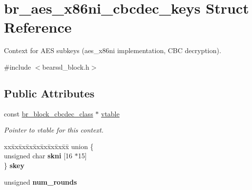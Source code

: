 \hypertarget{structbr__aes__x86ni__cbcdec__keys}{}\section{br\+\_\+aes\+\_\+x86ni\+\_\+cbcdec\+\_\+keys Struct Reference}
\label{structbr__aes__x86ni__cbcdec__keys}


Context for A\+ES subkeys ({\ttfamily aes\+\_\+x86ni} implementation, C\+BC decryption).  




{\ttfamily \#include $<$bearssl\+\_\+block.\+h$>$}

\subsection*{Public Attributes}
\begin{DoxyCompactItemize}
\item 
\mbox{\label{structbr__aes__x86ni__cbcdec__keys_a60addc6b6c10c21aa5e96c62f81ce48e}} 
const \hyperlink{bearssl__block_8h_a5542970c820eeee2e62766368be8fb7f}{br\+\_\+block\+\_\+cbcdec\+\_\+class} $\ast$ \hyperlink{structbr__aes__x86ni__cbcdec__keys_a60addc6b6c10c21aa5e96c62f81ce48e}{vtable}
\begin{DoxyCompactList}\small\item\em Pointer to vtable for this context. \end{DoxyCompactList}\item 
\mbox{\label{structbr__aes__x86ni__cbcdec__keys_a570e4ae066683062b8ebf0252ccd7661}} 
\begin{tabbing}
xx\=xx\=xx\=xx\=xx\=xx\=xx\=xx\=xx\=\kill
union \{\\
\>unsigned char {\bfseries skni} \mbox{[}16 $\ast$15\mbox{]}\\
\} {\bfseries skey}\\

\end{tabbing}\item 
\mbox{\label{structbr__aes__x86ni__cbcdec__keys_a8348b29c3a76c0abdee862714e4eaf50}} 
unsigned {\bfseries num\+\_\+rounds}
\end{DoxyCompactItemize}


